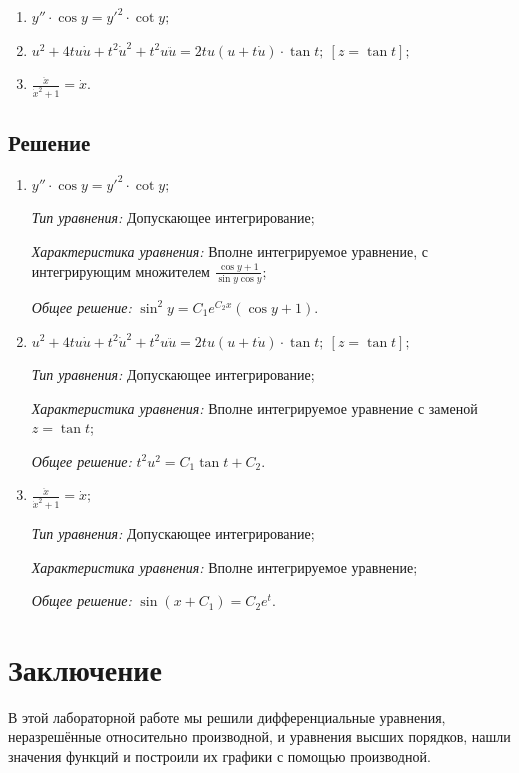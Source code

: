 \documentclass[14pt, a4paper, titlepage, fleqn]{extarticle}
\begin{document}
            \begin{enumerate}
                \item \( y'' \cdot \cos{y} = y'^2 \cdot \cot{y}; \)
                \item \( u^2 + 4tu \dot{u} + t^2 \dot{u}^2 + t^2 u \ddot{u} = 2tu \left( u + t \dot{u} \right) \cdot \tan{t}; ~ [z = \tan{t}]; \)
                \item \( \frac{\ddot{x}}{\dot{x}^2 + 1} = \dot{x}. \)
            \end{enumerate}

        
        \subsection{Решение}
            \begin{enumerate}
                \item \( y'' \cdot \cos{y} = y'^2 \cdot \cot{y}; \)
                    
                    \textit{Тип уравнения:} 
                        Допускающее интегрирование;

                    \textit{Характеристика уравнения:}
                        Вполне интегрируемое уравнение, с интегрирующим множителем \( \frac{\cos{y} + 1}{\sin{y}\cos{y}} \);

                    \textit{Общее решение:} \( \sin^2{y} = C_1 e^{C_2 x} \left( \cos{y}+1 \right). \)

                \item \( u^2 + 4tu \dot{u} + t^2 \dot{u}^2 + t^2 u \ddot{u} = 2tu \left( u + t \dot{u} \right) \cdot \tan{t}; ~ [z = \tan{t}]; \)
                
                    \textit{Тип уравнения:}
                        Допускающее интегрирование;

                    \textit{Характеристика уравнения:}
                        Вполне интегрируемое уравнение с заменой \( z = \tan{t} \);

                    \textit{Общее решение:} \( t^2u^2 = C_1 \tan{t} + C_2. \)


                \pagebreak

                \item \( \frac{\ddot{x}}{\dot{x}^2 + 1} = \dot{x}; \)
                                
                    \textit{Тип уравнения:}
                        Допускающее интегрирование;

                    \textit{Характеристика уравнения:}
                        Вполне интегрируемое уравнение;

                    \textit{Общее решение:} \( \sin\left(x + C_1\right) = C_2 e^t. \)
                    


            \end{enumerate}


    \pagebreak

    \section{Заключение}
        В этой лабораторной работе мы решили дифференциальные уравнения, неразрешённые относительно производной, и уравнения высших порядков, нашли значения функций и построили их графики с помощью производной.
\end{document}
